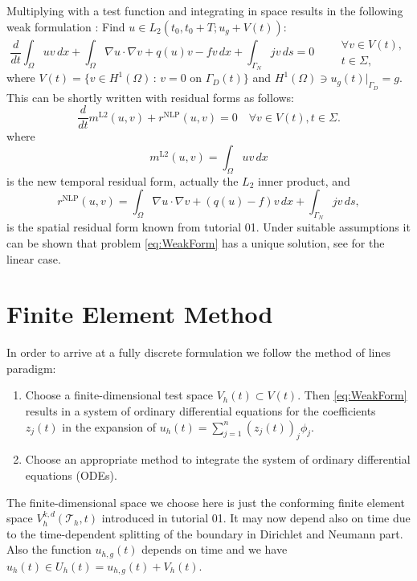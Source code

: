 \documentclass[a4paper,12pt]{article}
\begin{document}
Multiplying with a test function and integrating in space
results in the following weak formulation \cite{Ern}:
Find $u\in L_2(t_0,t_0+T;u_g+V(t))$:
\begin{equation}
\frac{d}{dt} \int_\Omega u v \,dx+ \int_\Omega \nabla u \cdot \nabla v
+ q(u) v - f v \, dx + \int_{\Gamma_N} jv \, ds = 0 \qquad
\begin{array}{l}
\forall v \in V(t),\\
t \in \Sigma,
\end{array}
\label{eq:WeakForm}
\end{equation}
where $V(t) = \{v\in H^1(\Omega)\,:\, \text{$v=0$ on $\Gamma_D(t)$}\}$
and $H^1(\Omega)\ni u_g(t)|_{\Gamma_D}=g$. This can be shortly written
with residual forms as follows:
\begin{equation*}
\frac{d}{dt} m^{\text{L2}}(u,v) + r^{\text{NLP}}(u,v) = 0 \quad \forall v \in V(t), t \in \Sigma.
\end{equation*}
where
\begin{equation*}
m^{\text{L2}}(u,v) = \int_\Omega u v \,dx
\end{equation*}
is the new temporal residual form, actually the $L_2$ inner product, and
\begin{equation*}
r^{\text{NLP}}(u,v) = \int_\Omega \nabla u \cdot \nabla v + (q(u)-f)v\,dx + \int_{\Gamma_N} jv\,ds ,
\end{equation*}
is the spatial residual form known from tutorial 01.
Under suitable assumptions it can be shown that problem \eqref{eq:WeakForm} has
a unique solution, see \cite{Ern} for the linear case.

\section{Finite Element Method}

In order to arrive at a fully discrete formulation we follow the method of lines
paradigm:
\begin{enumerate}[1)]
\item Choose a finite-dimensional test space $V_h(t)\subset V(t)$. Then \eqref{eq:WeakForm}
results in a system of ordinary differential equations for the coefficients $z_j(t)$
in the expansion of $u_h(t)=\sum_{j=1}^n (z_j(t))_j \phi_j$.
\item Choose an appropriate method to integrate the system of ordinary differential equations (ODEs).
\end{enumerate}

The finite-dimensional space we choose here is just the conforming
finite element space $V_h^{k,d}(\mathcal{T}_h,t)$ introduced in tutorial 01.
It may now depend also on time due to the time-dependent splitting of the boundary
in Dirichlet and Neumann part. Also the function $u_{h,g}(t)$ depends on time
and we have $u_h(t)\in U_h(t) = u_{h,g}(t) + V_h(t)$.
\end{document}
